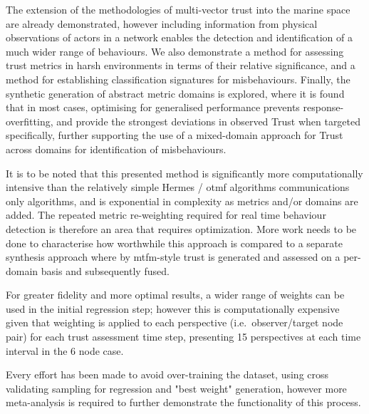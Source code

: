 The extension of the methodologies of multi-vector trust into the marine space are already demonstrated, however including information from physical observations of actors in a network enables the detection and identification of a much wider range of behaviours.
We also demonstrate a method for assessing trust metrics in harsh environments in terms of their relative significance, and a method for establishing classification signatures for misbehaviours.
Finally, the synthetic generation of abstract metric domains is explored, where it is found that in most cases, optimising for generalised performance prevents response-overfitting, and provide the strongest deviations in observed Trust when targeted specifically, further supporting the use of a mixed-domain approach for Trust across domains for identification of misbehaviours.

It is to be noted that this presented method is significantly more computationally intensive than the relatively simple Hermes / \gls{otmf} algorithms communications only algorithms, and is exponential in complexity as metrics and/or domains are added. The repeated metric re-weighting required for real time behaviour detection is therefore an area that requires optimization. More work needs to be done to characterise how worthwhile this approach is compared to a separate synthesis approach where by \gls{mtfm}-style trust is generated and assessed on a per-domain basis and subsequently fused.

For greater fidelity and more optimal results, a wider range of weights can be used in the initial regression step; however this is computationally expensive given that weighting is applied to each perspective (i.e.\ observer/target node pair) for each trust assessment time step, presenting 15 perspectives at each time interval in the 6 node case.

Every effort has been made to avoid over-training the dataset, using cross validating sampling for regression and "best weight" generation, however more meta-analysis is required to further demonstrate the functionality of this process.



